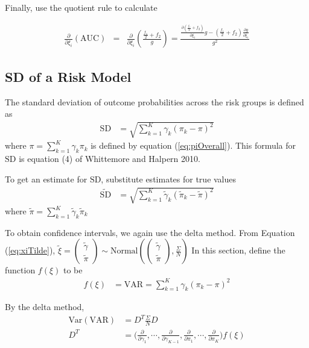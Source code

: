 \documentclass[11pt]{article}
\begin{document}
Finally, use the quotient rule to calculate

\begin{eqnarray}
\frac{\partial}{\partial \xi_i } \left(\mbox{AUC}\right) & = &     
                    \frac{\partial}{\partial \xi_i
                    }\left(\frac{\frac{f_1}{2} + f_2}{g}\right)  
= 
                    \frac{
                              \frac{\partial(\frac{f_1}{2} + f_2)}{\partial \xi_i }g - (\frac{f_1}{2}+f_2)
                              \frac{\partial g}{\partial \xi_i }
                           }{g^2}
\end{eqnarray}


\subsection{SD of a Risk Model}


The standard deviation of outcome probabilities across the risk groups
is defined as 
\begin{align}
\mbox{SD} & = \sqrt{ \sum_{k=1}^K{\gamma_k (\pi_k - \pi)^2} }
\end{align}
where $\pi = \sum_{k=1}^K{\gamma_k \pi_k}$ is defined by equation  
(\ref{eq:piOverall}). This formula for $\mbox{SD}$  is equation (4) of Whittemore and
Halpern 2010. 

To get an estimate for $\mbox{SD}$, substitute estimates for true
values
\begin{align}
\tilde{\mbox{SD}} & = \sqrt{ 
\sum_{k=1}^K{\tilde{\gamma}_k (\tilde{\pi}_k - \tilde{\pi})^2} }
\end{align}
where
$\tilde{\pi} = \sum_{k=1}^K{\tilde{\gamma}_k \tilde{\pi}_k}$

To obtain confidence intervals, we again use the delta method.  
From Equation (\ref{eq:xiTilde}), 
$\tilde{\xi} = \begin{pmatrix}  \tilde{\gamma}\\
  \tilde{\pi}  \end{pmatrix} \sim \mbox{Normal}(
\begin{pmatrix}  \tilde{\gamma}\\  \tilde{\pi}  \end{pmatrix},
 \frac{\Sigma}{N}
)$
In this section, define the function $f(\xi)$ to be
\begin{align}
f(\xi) & = \mbox{VAR} = \sum_{k=1}^K{\gamma_k (\pi_k - \pi)^2} 
\end{align}

By the delta method,
\begin{align}
\mbox{Var}(\mbox{VAR}) & =  D^T \frac{\Sigma}{N} D\\
D^T & = \bigg(
\frac{ \partial }{ \partial \gamma_1 }, \cdots,
\frac{ \partial }{ \partial \gamma_{K-1} },
\frac{ \partial }{ \partial \pi_1 }, \cdots,
\frac{ \partial }{ \partial \pi_K }
\bigg) f(\xi)
\end{align}
\end{document}

